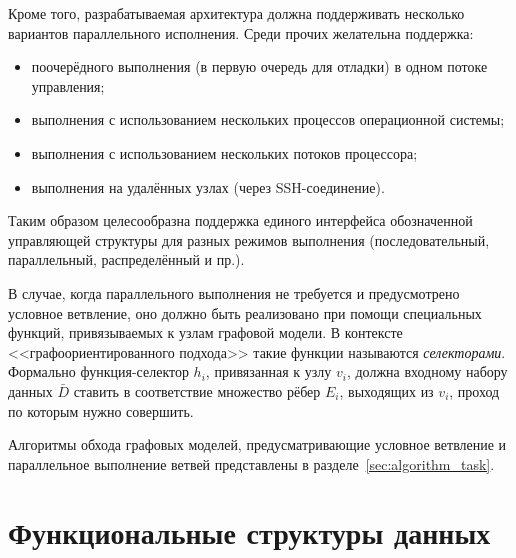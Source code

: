 Кроме того, разрабатываемая архитектура должна поддерживать несколько вариантов параллельного исполнения. Среди прочих желательна поддержка:
\begin{itemize}
    \item поочерёдного выполнения (в первую очередь для отладки) в одном потоке управления;
    \item выполнения с использованием нескольких процессов операционной системы;
    \item выполнения с использованием нескольких потоков процессора;
    \item выполнения на удалённых узлах (через SSH-соединение).
\end{itemize}

Таким образом целесообразна поддержка единого интерфейса обозначенной управляющей структуры для разных режимов выполнения (последовательный, параллельный, распределённый и пр.).

В случае, когда параллельного выполнения не требуется и предусмотрено условное ветвление, оно должно быть реализовано при помощи специальных функций, привязываемых к узлам графовой модели. В контексте <<графоориентированного подхода>> такие функции называются \emph{селекторами}. Формально функция-селектор $h_i$, привязанная к узлу $v_i$, должна входному набору данных $\bar{D}$ ставить в соответствие множество рёбер $E_i$, выходящих из $v_i$, проход по которым нужно совершить.

Алгоритмы обхода графовых моделей, предусматривающие условное ветвление и параллельное выполнение ветвей представлены в разделе~\ref{sec:algorithm_task}.
\section{Функциональные структуры данных}\label{sec:functional_classes}
